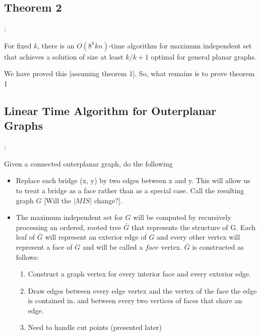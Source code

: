 \documentclass{beamer}
\begin{document}
\subsection{Theorem 2}
\begin{frame}{\secname : \subsecname}
    \begin{theorem}
        [Baker, 1994] For fixed $k$, there is an
$O(8^kkn)$-time algorithm for maximum independent set
that achieves a solution of size at least $k/k+1$ optimal for
general planar graphs. 
    \end{theorem}

    We have proved this [assuming theorem 1]. So, what remains is to prove theorem 1
\end{frame}
\subsection{Linear Time Algorithm for Outerplanar Graphs}
\begin{frame}{\secname : \subsecname}
    \begin{block}{Given a connected outerplanar graph, do the following}
    \begin{itemize}
        \item Replace each bridge (x, y) by two
        edges between x and y. This will allow us to treat a bridge as a face rather
        than as a special case. Call the resulting graph $G$ [Will the $|MIS|$ change?].

        \item The maximum independent set for $G$ will be computed by recursively
processing an ordered, rooted tree $\bar{G}$ that represents the structure of G. Each
leaf of $\bar{G}$ will represent an exterior edge of $G$ and every other vertex will represent
a face of $G$ and will be called a $face$ vertex. $\bar{G}$ is constructed as follows:
        \begin{enumerate}
        \item Construct a graph vertex for every interior face and
        every exterior edge.

        \item Draw edges between every edge vertex and the vertex of the face the edge is contained in, and between
        every two vertices of faces that share an edge.

        \item Need to handle cut points (presented later)      
        \end{enumerate}
    \end{itemize}
    \end{block}

\end{frame}
\end{document}
